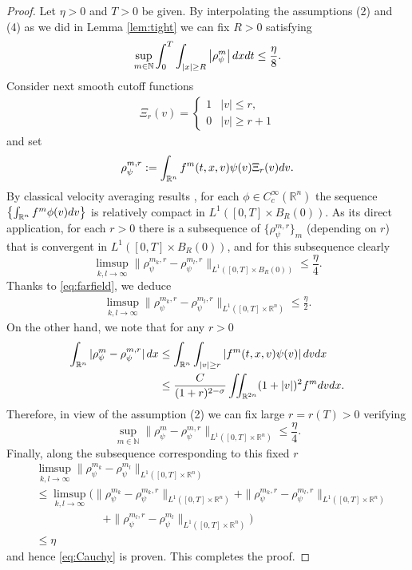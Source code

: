 \documentclass{amsart}
\theoremstyle{plain}
\theoremstyle{remark}
\numberwithin{equation}{section}
\newcommand{\R}{\mathbb{R}}
\newcommand{\dx}{\textnormal{d}x}
\newcommand{\dv}{\textnormal{d}v}
\newcommand{\dt}{\textnormal{d}t}
\newcommand{\intr}{\int_{\R^n}}
\begin{document}
\begin{proof}
Let $\eta>0$ and $T>0$ be given. By interpolating the assumptions (2) and (4) as we did in Lemma \ref{lem:tight} we can fix $R>0$ satisfying
    \begin{equation}\label{eq:farfield}
    \sup_{m\in \mathbb{N}} \int_0^T\int_{|x|\ge R} \left| \rho_{\psi}^m \right| \dx  \dt \le \frac{\eta}{8}.
    \end{equation}
Consider next smooth cutoff functions
    \begin{align*}
        \Xi_r(v) = \begin{cases}
            1 & |v| \le r,\\
            0 & |v| \ge r+1
        \end{cases}
    \end{align*}
    and set
    \begin{align*}
        \rho_{\psi}^{m,r} := \int_{\R^n} f^m(t,x,v) \psi(v) \Xi_r(v) \dv.
    \end{align*}
By classical velocity averaging results \cite[Section III]{dipernalionsmeyer1991}, for each $\phi \in C_c^\infty(\R^n)$ the sequence $\left\{\int_{\R^n} f^m \phi(v)\dv\right\}$ is relatively compact in $L^1([0,T]\times B_R(0))$. As its direct application, for each $r>0$ there is a subsequence of $\{\rho_\psi^{m,r}\}_m$ (depending on $r$) that is convergent in $L^1([0,T]\times B_R(0))$, and for this subsequence clearly
\begin{equation*}
\limsup_{k,l\to \infty} \|\rho_\psi^{m_k,r} - \rho_\psi^{m_l,r}\|_{L^1([0,T]\times B_R(0))} \le \frac{\eta}{4}.
\end{equation*}
Thanks to \eqref{eq:farfield}, we deduce
\begin{align*}
    \limsup_{k,l\to\infty} \|\rho_\psi^{m_k,r} - \rho_\psi^{m_l,r}\|_{L^1([0,T]\times \R^n)}  \le \frac{\eta}{2}.
\end{align*}
On the other hand, we note that for any $r>0$
\begin{align*}
\intr |\rho_\psi^m - \rho_\psi^{m,r}| \, \dx &\le  \int_{\R^n}\int_{|v|\ge r} |f^m(t,x,v)\psi(v)| \, \dv \dx  \\
&\le \frac{C}{(1+r)^{2-\sigma}}\iint_{\R^{2n}} (1+|v|)^2 f^m \dv\dx.
\end{align*} 
Therefore, in view of the assumption (2) we can fix large $r = r(T) >0$ verifying
\[
\sup_{m\in \mathbb{N}} \|\rho_\psi^m - \rho_\psi^{m,r}\|_{L^1([0,T]\times \R^n)} \le \frac{\eta}{4}.
\]
Finally, along the subsequence corresponding to this fixed $r$
\begin{align*}
    &\limsup_{k,l\to\infty}\|\rho_{\psi}^{m_k} - \rho_{\psi}^{m_l}\|_{L^1([0,T]\times \R^n)}\\
    &\le \limsup_{k,l\to\infty} \Big(\|\rho_\psi^{m_k} - \rho_{\psi}^{m_k,r}\|_{L^1([0,T]\times \R^n)} + \|\rho_{\psi}^{m_k,r} - \rho_\psi^{m_l,r}\|_{L^1([0,T]\times \R^n)}\\
    &\qquad \qquad \qquad + \|\rho_\psi^{m_l,r} - \rho_\psi^{m_l}\|_{L^1([0,T]\times\R^n)}\Big)\\
    &\le \eta
\end{align*}
and hence \eqref{eq:Cauchy} is proven. This completes the proof.
\end{proof}
\end{document}
